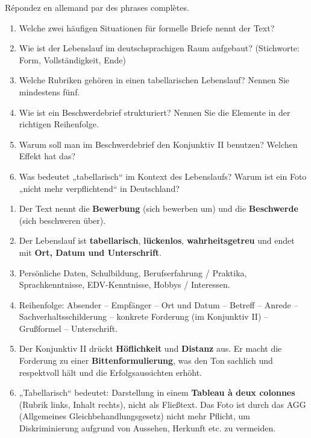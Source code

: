 \documentclass[11pt]{article}
\newcounter{popsec}
\newcounter{popsub}
\newcommand{\courssub}[1]{%
  \stepcounter{popsub}%
  \par\vspace{9pt}\noindent{\popxbold\fontsize{11.5}{13}\selectfont\color{popink}{\color{poporange}\thepopsec.\thepopsub}\hspace{6pt}#1}\par\nopagebreak\vspace{4pt}
}
\begin{document}
\courssub{Compréhension du texte}

\begin{exercice}
Répondez en allemand par des phrases complètes.
\begin{enumerate}
\item Welche zwei häufigen Situationen für formelle Briefe nennt der Text?
\item Wie ist der Lebenslauf im deutschsprachigen Raum aufgebaut? (Stichworte: Form, Vollständigkeit, Ende)
\item Welche Rubriken gehören in einen tabellarischen Lebenslauf? Nennen Sie mindestens fünf.
\item Wie ist ein Beschwerdebrief strukturiert? Nennen Sie die Elemente in der richtigen Reihenfolge.
\item Warum soll man im Beschwerdebrief den Konjunktiv II benutzen? Welchen Effekt hat das?
\item Was bedeutet „tabellarisch“ im Kontext des Lebenslaufs? Warum ist ein Foto „nicht mehr verpflichtend“ in Deutschland?
\end{enumerate}
\end{exercice}

\begin{corrige}
\begin{enumerate}
\item Der Text nennt die \textbf{Bewerbung} (sich bewerben um) und die \textbf{Beschwerde} (sich beschweren über).
\item Der Lebenslauf ist \textbf{tabellarisch}, \textbf{lückenlos}, \textbf{wahrheitsgetreu} und endet mit \textbf{Ort, Datum und Unterschrift}.
\item Persönliche Daten, Schulbildung, Berufserfahrung / Praktika, Sprachkenntnisse, EDV-Kenntnisse, Hobbys / Interessen.
\item Reihenfolge: Absender – Empfänger – Ort und Datum – Betreff – Anrede – Sachverhaltsschilderung – konkrete Forderung (im Konjunktiv II) – Grußformel – Unterschrift.
\item Der Konjunktiv II drückt \textbf{Höflichkeit} und \textbf{Distanz} aus. Er macht die Forderung zu einer \textbf{Bittenformulierung}, was den Ton sachlich und respektvoll hält und die Erfolgsaussichten erhöht.
\item „Tabellarisch“ bedeutet: Darstellung in einem \textbf{Tableau à deux colonnes} (Rubrik links, Inhalt rechts), nicht als Fließtext. Das Foto ist durch das AGG (Allgemeines Gleichbehandlungsgesetz) nicht mehr Pflicht, um Diskriminierung aufgrund von Aussehen, Herkunft etc. zu vermeiden.
\end{enumerate}
\end{corrige}
\end{document}
